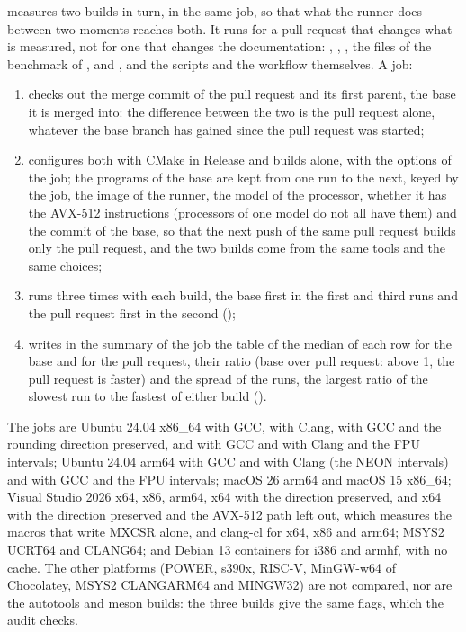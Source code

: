 \medskip
{} measures two builds in turn, in the same job, so that
what the runner does between two moments reaches both.\newinvfive{} It runs
for a pull request that changes what is measured, not for one that changes
the documentation: , , ,
the files of the benchmark of , 
and , and the scripts and the workflow themselves. A job:
\begin{enumerate}
\item checks out the merge commit of the pull request and its first parent,
  the base it is merged into: the difference between the two is the pull
  request alone, whatever the base branch has gained since the pull request
  was started;
\item configures both with CMake in Release and builds 
  alone, with the options of the job; the programs of the base are kept
  from one run to the next, keyed by the job, the image of the runner, the
  model of the processor, whether it has the AVX-512 instructions
  (processors of one model do not all have them) and the commit of the
  base, so that the next push of the same pull request builds only the pull
  request, and the two builds come from the same tools and the same
  choices;
\item runs  three times with each build, the base
  first in the first and third runs and the pull request first in the second
  ();
\item writes in the summary of the job the table of the median of each row
  for the base and for the pull request, their ratio (base over pull
  request: above 1, the pull request is faster) and the spread of the runs,
  the largest ratio of the slowest run to the fastest of either build
  ().
\end{enumerate}

\noindent
The jobs are Ubuntu 24.04 x86\_64 with GCC, with Clang, with GCC and the
rounding direction preserved, and with GCC and with Clang and the FPU
intervals; Ubuntu 24.04 arm64 with GCC and with Clang (the NEON intervals)
and with GCC and the FPU intervals; macOS 26 arm64 and macOS 15 x86\_64;
Visual Studio 2026 x64, x86, arm64, x64 with the direction preserved, and x64
with the direction preserved and the AVX-512 path left out, which measures the
macros that write MXCSR alone, and clang-cl for x64, x86 and arm64; MSYS2 UCRT64 and CLANG64; and Debian 13 containers for i386 and armhf, with no cache. The
other platforms (POWER, s390x, RISC-V, MinGW-w64 of Chocolatey, MSYS2 CLANGARM64
and MINGW32) are not compared, nor are the autotools and meson builds:
the three builds give the same flags, which the audit checks.


